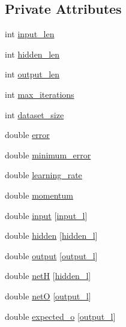 \subsection*{Private Attributes}
\begin{DoxyCompactItemize}
\item 
int \hyperlink{a00003_a9e5319bf385fa55bbbd8f0160915306d}{input\-\_\-len}
\item 
int \hyperlink{a00003_a71cc8ca03da47fe639dd1e8ed518069c}{hidden\-\_\-len}
\item 
int \hyperlink{a00003_a053d2b510e07b1f25ef112f366bc62ba}{output\-\_\-len}
\item 
int \hyperlink{a00003_ac3c1eed9835dc5da84132d08c090612f}{max\-\_\-iterations}
\item 
int \hyperlink{a00003_a8fe39196b36a38696abd679328dd8232}{dataset\-\_\-size}
\item 
double \hyperlink{a00003_a2ffe42aee798e268d4bbf0f3428ba430}{error}
\item 
double \hyperlink{a00003_aa2898d2ec7ac091b6d40916d4b113a93}{minimum\-\_\-error}
\item 
double \hyperlink{a00003_a1994986029a1ef9d55fa4bb1b440210b}{learning\-\_\-rate}
\item 
double \hyperlink{a00003_a3a3ea713384da26e538bc60da8410a75}{momentum}
\item 
double \hyperlink{a00003_a347a1fceb1ac048ecd913a89126cebb3}{input} \mbox{[}\hyperlink{a00008_a8dae3b2c955083e02ba56da92adbf25d}{input\-\_\-l}\mbox{]}
\item 
double \hyperlink{a00003_a5b31deacdc5c63e687d6ebc086b761ab}{hidden} \mbox{[}\hyperlink{a00008_aa7fdf42e8c0a65ea15cb37a990708e36}{hidden\-\_\-l}\mbox{]}
\item 
double \hyperlink{a00003_abe5631cce6141b7756154a5a9d247da2}{output} \mbox{[}\hyperlink{a00008_a0a0ddfc9fb3bc3d90d175ed1f7bd54c5}{output\-\_\-l}\mbox{]}
\item 
double \hyperlink{a00003_aa07e5b1f8997f895d7550495a5b4f0d2}{net\-H} \mbox{[}\hyperlink{a00008_aa7fdf42e8c0a65ea15cb37a990708e36}{hidden\-\_\-l}\mbox{]}
\item 
double \hyperlink{a00003_a8bcf19afde3c08afbd862759c839a769}{net\-O} \mbox{[}\hyperlink{a00008_a0a0ddfc9fb3bc3d90d175ed1f7bd54c5}{output\-\_\-l}\mbox{]}
\item 
double \hyperlink{a00003_a8d632cf69d2fcd076e473aba1ae74702}{expected\-\_\-o} \mbox{[}\hyperlink{a00008_a0a0ddfc9fb3bc3d90d175ed1f7bd54c5}{output\-\_\-l}\mbox{]}
\item 

\end{DoxyCompactItemize}
